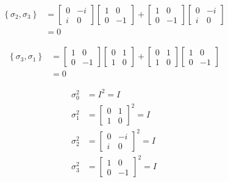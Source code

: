 \begin{align*}
\left\{\sigma_2, \sigma_3 \right\} &= \begin{bmatrix}
0 & -i \\
i & 0
\end{bmatrix}
\begin{bmatrix}
1 & 0 \\
0 & -1
\end{bmatrix}
+
\begin{bmatrix}
1 & 0 \\
0 & -1
\end{bmatrix}
\begin{bmatrix}
0 & -i \\
i & 0
\end{bmatrix}\\
&=0
\end{align*}



\begin{align*}
\left\{\sigma_3, \sigma_1 \right\} &= \begin{bmatrix}
1 & 0 \\
0 & -1
\end{bmatrix}
\begin{bmatrix}
0 & 1 \\
1 & 0
\end{bmatrix}
+
\begin{bmatrix}
0 & 1 \\
1 & 0
\end{bmatrix}
\begin{bmatrix}
1 & 0 \\
0 & -1
\end{bmatrix}\\
&=0
\end{align*}

\begin{align*}
	\sigma_0^2 &= I^2 = I\\
%
	\sigma_1^2 &= \begin{bmatrix}
	0 & 1 \\
	1 & 0
	\end{bmatrix} ^2 = I\\
%
	\sigma_2^2 &= \begin{bmatrix}
	0 & -i \\
	i & 0
	\end{bmatrix} ^2 = I\\
%
	\sigma_3^2 &= \begin{bmatrix}
	1 & 0 \\
	0 & -1
	\end{bmatrix} ^2 = I
\end{align*}



